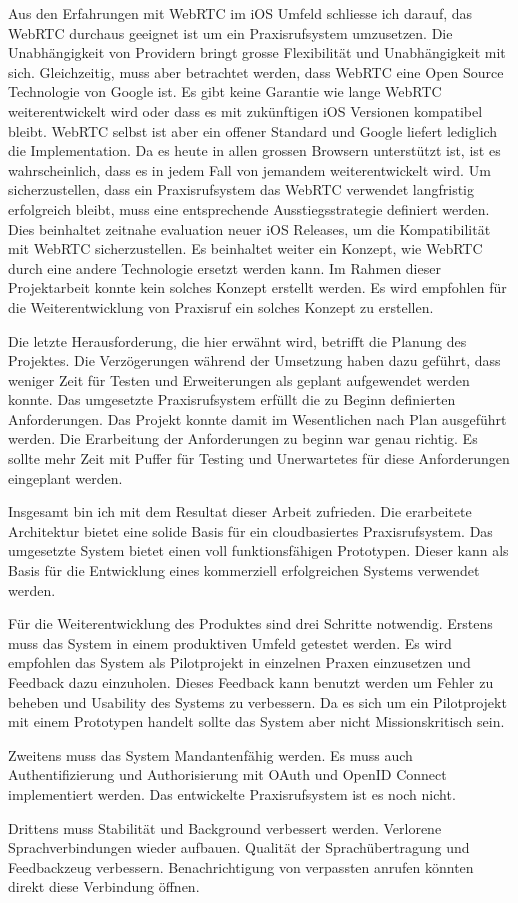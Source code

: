 Aus den Erfahrungen mit WebRTC im iOS Umfeld schliesse ich darauf, das WebRTC durchaus geeignet ist um ein Praxisrufsystem umzusetzen.
Die Unabhängigkeit von Providern bringt grosse Flexibilität und Unabhängigkeit mit sich.
Gleichzeitig, muss aber betrachtet werden, dass WebRTC eine Open Source Technologie von Google ist.
Es gibt keine Garantie wie lange WebRTC weiterentwickelt wird oder dass es mit zukünftigen iOS Versionen kompatibel bleibt.
WebRTC selbst ist aber ein offener Standard und Google liefert lediglich die Implementation.
Da es heute in allen grossen Browsern unterstützt ist, ist es wahrscheinlich, dass es in jedem Fall von jemandem weiterentwickelt wird.
Um sicherzustellen, dass ein Praxisrufsystem das WebRTC verwendet langfristig erfolgreich bleibt, muss eine entsprechende Ausstiegsstrategie definiert werden.
Dies beinhaltet zeitnahe evaluation neuer iOS Releases, um die Kompatibilität mit WebRTC sicherzustellen.
Es beinhaltet weiter ein Konzept, wie WebRTC durch eine andere Technologie ersetzt werden kann.
Im Rahmen dieser Projektarbeit konnte kein solches Konzept erstellt werden.
Es wird empfohlen für die Weiterentwicklung von Praxisruf ein solches Konzept zu erstellen.

Die letzte Herausforderung, die hier erwähnt wird, betrifft die Planung des Projektes.
Die Verzögerungen während der Umsetzung haben dazu geführt, dass weniger Zeit für Testen und Erweiterungen als geplant aufgewendet werden konnte.
Das umgesetzte Praxisrufsystem erfüllt die zu Beginn definierten Anforderungen.
Das Projekt konnte damit im Wesentlichen nach Plan ausgeführt werden.
Die Erarbeitung der Anforderungen zu beginn war genau richtig.
Es sollte mehr Zeit mit Puffer für Testing und Unerwartetes für diese Anforderungen eingeplant werden.

Insgesamt bin ich mit dem Resultat dieser Arbeit zufrieden.
Die erarbeitete Architektur bietet eine solide Basis für ein cloudbasiertes Praxisrufsystem.
Das umgesetzte System bietet einen voll funktionsfähigen Prototypen.
Dieser kann als Basis für die Entwicklung eines kommerziell erfolgreichen Systems verwendet werden.

Für die Weiterentwicklung des Produktes sind drei Schritte notwendig.
Erstens muss das System in einem produktiven Umfeld getestet werden.
Es wird empfohlen das System als Pilotprojekt in einzelnen Praxen einzusetzen und Feedback dazu einzuholen.
Dieses Feedback kann benutzt werden um Fehler zu beheben und Usability des Systems zu verbessern.
Da es sich um ein Pilotprojekt mit einem Prototypen handelt sollte das System aber nicht Missionskritisch sein.

Zweitens muss das System Mandantenfähig werden.
Es muss auch Authentifizierung und Authorisierung mit OAuth und OpenID Connect implementiert werden.
Das entwickelte Praxisrufsystem ist es noch nicht.

Drittens muss Stabilität und Background verbessert werden.
Verlorene Sprachverbindungen wieder aufbauen.
Qualität der Sprachübertragung und Feedbackzeug verbessern.
Benachrichtigung von verpassten anrufen könnten direkt diese Verbindung öffnen.
